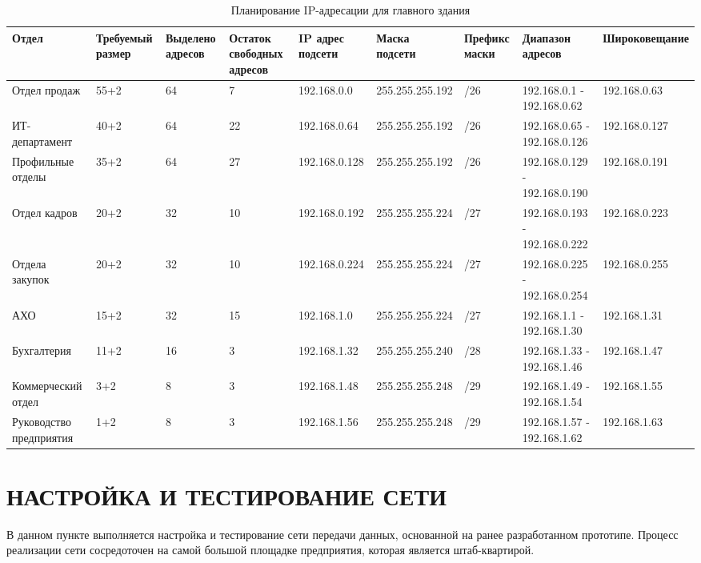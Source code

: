 \documentclass[14pt, a4paper]{extarticle}
\begin{document}
\begin{landscape}
\begin{table}[H]
\centering
\small
\caption{Планирование IP-адресации для главного здания}
\begin{tabular}{|m{3cm}|m{2cm}|m{2cm}|m{2cm}|m{2.3cm}|m{3cm}|m{2.2cm}|m{2.6cm}|m{3.6cm}|}
\hline
\textbf{Отдел} & \textbf{Требуемый размер} & \textbf{Выделено адресов} & \textbf{Остаток свободных адресов} & \textbf{IP адрес подсети} & \textbf{Маска подсети} & \textbf{Префикс маски} & \textbf{Диапазон адресов} & \textbf{Широковещание} \\
\hline
Отдел продаж & 55+2 & 64 & 7 & 192.168.0.0 & 255.255.255.192 & /26 & 192.168.0.1 - 192.168.0.62 & 192.168.0.63 \\
\hline
ИТ-департамент & 40+2 & 64 & 22 & 192.168.0.64 & 255.255.255.192 & /26 & 192.168.0.65 - 192.168.0.126 & 192.168.0.127 \\
\hline
Профильные отделы & 35+2 & 64 & 27 & 192.168.0.128 & 255.255.255.192 & /26 & 192.168.0.129 - 192.168.0.190 & 192.168.0.191 \\
\hline
Отдел кадров & 20+2 & 32 & 10 & 192.168.0.192 & 255.255.255.224 & /27 & 192.168.0.193 - 192.168.0.222 & 192.168.0.223 \\
\hline
Отдела закупок & 20+2 & 32 & 10 & 192.168.0.224 & 255.255.255.224 & /27 & 192.168.0.225 - 192.168.0.254 & 192.168.0.255 \\
\hline
АХО & 15+2 & 32 & 15 & 192.168.1.0 & 255.255.255.224 & /27 & 192.168.1.1 - 192.168.1.30 & 192.168.1.31 \\
\hline
Бухгалтерия & 11+2 & 16 & 3 & 192.168.1.32 & 255.255.255.240 & /28 & 192.168.1.33 - 192.168.1.46 & 192.168.1.47 \\
\hline
Коммерческий отдел & 3+2 & 8 & 3 & 192.168.1.48 & 255.255.255.248 & /29 & 192.168.1.49 - 192.168.1.54 & 192.168.1.55 \\
\hline
Руководство предприятия & 1+2 & 8 & 3 & 192.168.1.56 & 255.255.255.248 & /29 & 192.168.1.57 - 192.168.1.62 & 192.168.1.63 \\
\hline
\end{tabular}
\label{table:2:mainDepIPplanning}
\end{table}
\end{landscape}
\newpage


\section{НАСТРОЙКА И ТЕСТИРОВАНИЕ СЕТИ}
В данном пункте выполняется настройка и тестирование сети передачи
данных, основанной на ранее разработанном прототипе. Процесс реализации
сети сосредоточен на самой большой площадке предприятия, которая является
штаб-квартирой.
\end{document}
